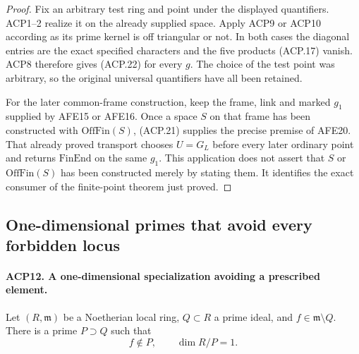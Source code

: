 \documentclass[11pt,a4paper]{article}
\numberwithin{equation}{section}
\theoremstyle{remark}\newtheorem{remark}[theorem]{Remark}
\begin{document}
\begin{proof}
Fix an arbitrary test ring and point under the displayed
quantifiers.  ACP1--2 realize it on the already supplied space.
Apply ACP9 or ACP10 according as its prime kernel is off
triangular or not.  In both cases the diagonal entries are
the exact specified characters and the five products (ACP.17)
vanish.  ACP8 therefore gives (ACP.22) for every \(g\).
The choice of the test point was arbitrary, so the original
universal quantifiers have all been retained.

For the later common-frame construction, keep the frame,
link and marked \(g_1\) supplied by AFE15 or AFE16.
Once a space \(S\) on that frame has been constructed with
\(\mathrm{OffFin}(S)\), (ACP.21) supplies the precise premise
of AFE20.  That already proved transport chooses
\(U=G_L\) before every later ordinary point and returns
\(\mathrm{FinEnd}\) on the same \(g_1\).  This application
does not assert that \(S\) or \(\mathrm{OffFin}(S)\) has been
constructed merely by stating them.  It identifies the exact
consumer of the finite-point theorem just proved.
\end{proof}

\subsection{One-dimensional primes that avoid every forbidden locus}

\paragraph{ACP12. A one-dimensional specialization avoiding a prescribed element.}
\label{claim:ACP12}
Let \((R,\mathfrak m)\) be a Noetherian local ring,
\(Q\subset R\) a prime ideal, and \(f\in\mathfrak m\setminus Q\).
There is a prime \(P\supset Q\) such that
\[
                    f\notin P,\qquad \dim R/P=1.
                                                        \tag{ACP.23}
\]
\end{document}
